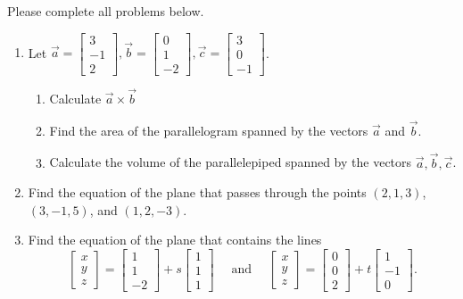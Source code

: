 \documentclass[12pt]{article}
\newcommand{\bbm}{\begin{bmatrix}}
\newcommand{\ebm}{\end{bmatrix}}
\begin{document}
\thispagestyle{fancy}
Please complete all problems below.
 \begin{enumerate}
  \item Let $\vec{a} = \bbm 3\\-1\\2\ebm, \vec{b} = \bbm 0\\1\\-2\ebm, \vec{c} = \bbm 3\\0\\-1\ebm$.
\begin{enumerate}
 \item Calculate $\vec{a}\times\vec{b}$

\vspace{24pt}

 \item Find the area of the parallelogram spanned by the vectors $\vec{a}$ and $\vec{b}$.

\vspace{24pt}

 \item Calculate the volume of the parallelepiped spanned by the vectors $\vec{a},\vec{b},\vec{c}$.

\vspace{36pt}


 \end{enumerate}


\item Find the equation of the plane that passes through the points $(2,1,3)$, $(3,-1,5)$, and $(1,2,-3)$.

\vspace{24pt}

\item Find the equation of the plane that contains the lines
\[
 \bbm x\\y\\z\ebm = \bbm 1\\1\\-2\ebm+s\bbm 1\\1\\1\ebm \quad \text{ and } \quad \bbm x\\y\\z\ebm = \bbm 0\\0\\2\ebm+t\bbm 1\\-1\\0\ebm.
\]
 

\vspace{24pt}


\end{enumerate}
\end{document}
